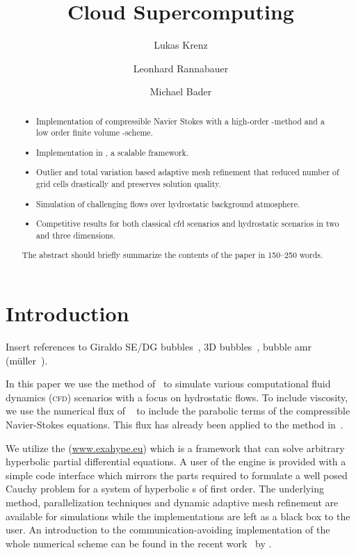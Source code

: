 \documentclass[runningheads]{llncs}
\title{Cloud Supercomputing}
\author{Lukas Krenz\inst{1} \and{} Leonhard Rannabauer\inst{1} \and{} Michael Bader\inst{1}}
\institute{Technical University of Munich} %
\begin{document}
\maketitle
\begin{abstract}

\begin{itemize}
\item Implementation of compressible Navier Stokes with a high-order \aderdg{}-method and a low order finite volume \muscl{}-scheme.
\item Implementation in \exahypeengine{}, a scalable \pde{} framework.
\item Outlier and total variation based adaptive mesh refinement that reduced number of grid cells drastically and preserves solution quality.
\item Simulation of challenging flows over hydrostatic background atmosphere.
\item Competitive results for both classical cfd scenarios and hydrostatic scenarios in two and three dimensions.
\end{itemize}
  
The abstract should briefly summarize the contents of the paper in
150--250 words.

\end{abstract}
\section{Introduction}

Insert references to Giraldo SE/DG bubbles~\cite{giraldo2008study}, 3D bubbles~\cite{giraldo2013implicit,kelly2012continuous}, bubble amr (müller~\cite{muller2010adaptive}).

In this paper we use the \aderdg{} method of~\cite{dumbser2008unified} to simulate various computational fluid dynamics (\textsc{cfd}) scenarios with a focus on hydrostatic flows.
To include viscosity, we use the numerical flux of \citeauthor{gassner2008discontinuous}~\cite{gassner2008discontinuous} to include the parabolic terms of the compressible Navier-Stokes equations.
This flux has already been applied to the \aderdg{} method in~\cite{dumbser2010arbitrary}.

We utilize the \exahypeengine{} (\url{www.exahype.eu}) which is a framework that can solve arbitrary hyperbolic partial differential equations.
A user of the engine is provided with a simple code interface which mirrors the parts required to formulate a well posed Cauchy problem for a system of hyperbolic \pde{}s of first order.
The underlying \aderdg{} method, parallelization techniques and dynamic adaptive mesh refinement are available for simulations while the implementations are left as a black box to the user.
An introduction to the communication-avoiding implementation of the whole numerical scheme can be found in the recent work~\cite{charrier2018stop} by \citeauthor{charrier2018stop}.
\end{document}
